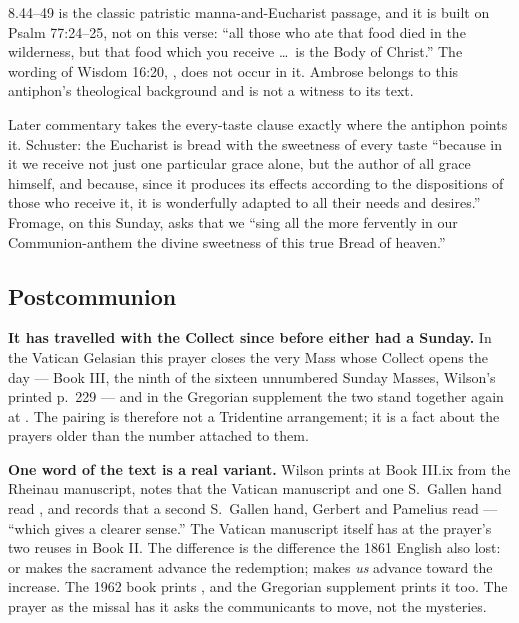 \begin{witnessnote}
 8.44--49 is the classic patristic manna-and-Eucharist
passage, and it is built on Psalm 77:24--25, not on this verse: ``all those who
ate that food died in the wilderness, but that food which you receive \dots\ is
the Body of Christ.'' The wording of Wisdom 16:20, ,
does not occur in it. Ambrose belongs to this antiphon's theological
background and is not a witness to its text.
\end{witnessnote}

Later commentary takes the every-taste clause exactly where the antiphon
points it. Schuster: the Eucharist is bread with the sweetness of every taste
``because in it we receive not just one particular grace alone, but the author
of all grace himself, and because, since it produces its effects according to
the dispositions of those who receive it, it is wonderfully adapted to all
their needs and desires.'' Fromage, on this Sunday, asks that we ``sing all
the more fervently in our Communion-anthem the divine sweetness of this true
Bread of heaven.''

\elementguard
\subsection*{Postcommunion }


\textbf{It has travelled with the Collect since before either had a Sunday.} In
the Vatican Gelasian this prayer closes the very Mass whose Collect opens the
day --- Book III, the ninth of the sixteen unnumbered Sunday Masses, Wilson's
printed p.~229 --- and in the Gregorian supplement the two stand together again
at . The pairing is therefore not a Tridentine
arrangement; it is a fact about the prayers older than the number attached to
them.

\textbf{One word of the text is a real variant.} Wilson prints
 at Book III.ix from the Rheinau manuscript, notes that the
Vatican manuscript and one S.\ Gallen hand read , and records
that a second S.\ Gallen hand, Gerbert and Pamelius read 
--- ``which gives a clearer sense.'' The Vatican manuscript itself has
 at the prayer's two reuses in Book II. The difference is
the difference the 1861 English also lost:  or
 makes the sacrament advance the redemption;
 makes \textit{us} advance toward the increase. The 1962
book prints , and the Gregorian supplement prints it too.
The prayer as the missal has it asks the communicants to move, not the
mysteries.

